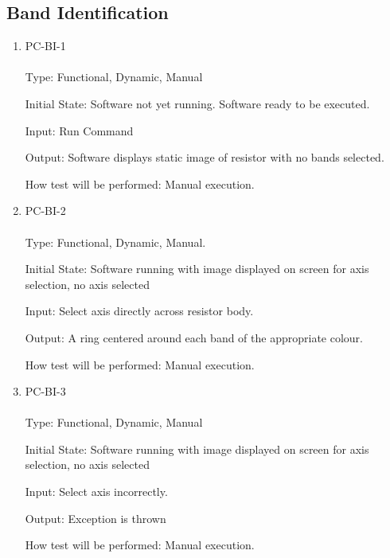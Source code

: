 \documentclass[12pt, titlepage]{article}
\begin{document}
\subsection{Band Identification}
\begin{enumerate}
\item{PC-BI-1\\}
\\
Type: Functional, Dynamic, Manual
					
Initial State: Software not yet running. Software ready to be executed.
					
Input: Run Command
					
Output: Software displays static image of resistor with no bands selected.
					
How test will be performed: Manual execution.
					
\item{PC-BI-2\\}
\\
Type: Functional, Dynamic, Manual.
					
Initial State: Software running with image displayed on screen for axis selection, no axis selected
					
Input: Select axis directly across resistor body.
					
Output:  A ring centered around each band of the appropriate colour.
					
How test will be performed:  Manual execution.

\item{PC-BI-3\\}
\\
Type: Functional, Dynamic, Manual
					
Initial State: Software running with image displayed on screen for axis selection, no axis selected
					
Input: Select axis incorrectly.
					
Output: Exception is thrown
					
How test will be performed: Manual execution.

\end{enumerate}
\end{document}
